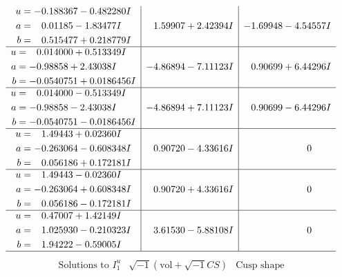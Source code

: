 \documentclass[1p]{elsarticle_modified}
\theoremstyle{definition}
\newcommand{\I}{\sqrt{-1}}
\begin{document}
$$\begin{array}{c|c|c}
\begin{aligned}
u &= -0.188367 - 0.482280 I \\
a &= \phantom{-}0.01185 - 1.83477 I \\
b &= \phantom{-}0.515477 + 0.218779 I\end{aligned}
 & \phantom{-}1.59907 + 2.42394 I & -1.69948 - 4.54557 I \\ \hline\begin{aligned}
u &= \phantom{-}0.014000 + 0.513349 I \\
a &= -0.98858 + 2.43038 I \\
b &= -0.0540751 + 0.0186456 I\end{aligned}
 & -4.86894 - 7.11123 I & \phantom{-}0.90699 + 6.44296 I \\ \hline\begin{aligned}
u &= \phantom{-}0.014000 - 0.513349 I \\
a &= -0.98858 - 2.43038 I \\
b &= -0.0540751 - 0.0186456 I\end{aligned}
 & -4.86894 + 7.11123 I & \phantom{-}0.90699 - 6.44296 I \\ \hline\begin{aligned}
u &= \phantom{-}1.49443 + 0.02360 I \\
a &= -0.263064 - 0.608348 I \\
b &= \phantom{-}0.056186 + 0.172181 I\end{aligned}
 & \phantom{-}0.90720 - 4.33616 I & \phantom{-0.000000 } 0 \\ \hline\begin{aligned}
u &= \phantom{-}1.49443 - 0.02360 I \\
a &= -0.263064 + 0.608348 I \\
b &= \phantom{-}0.056186 - 0.172181 I\end{aligned}
 & \phantom{-}0.90720 + 4.33616 I & \phantom{-0.000000 } 0 \\ \hline\begin{aligned}
u &= \phantom{-}0.47007 + 1.42149 I \\
a &= \phantom{-}1.025930 - 0.210323 I \\
b &= \phantom{-}1.94222 - 0.59005 I\end{aligned}
 & \phantom{-}3.61530 - 5.88108 I & \phantom{-0.000000 } 0\\
 \hline 
 \end{array}$$\newpage$$\begin{array}{c|c|c}  
\text{Solutions to }I^u_{1}& \I (\text{vol} + \sqrt{-1}CS) & \text{Cusp shape}\\

\end{array}$$
\end{document}
